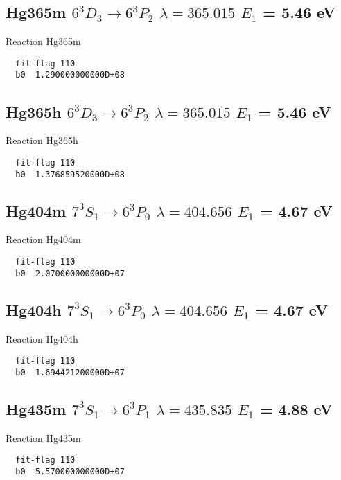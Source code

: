 \documentclass[12pt]{article}
\begin{document}
\subsection{
Hg365m   $6^3D_3 \rightarrow 6^3P_2 $ $\lambda= 365.015$ $E_1$ = 5.46 eV
}
Reaction Hg365m
\begin{small}\begin{verbatim}
  fit-flag 110
  b0  1.290000000000D+08
\end{verbatim}\end{small}

\subsection{
Hg365h   $6^3D_3 \rightarrow 6^3P_2 $ $\lambda= 365.015$ $E_1$ = 5.46 eV
}
Reaction Hg365h
\begin{small}\begin{verbatim}
  fit-flag 110
  b0  1.376859520000D+08
\end{verbatim}\end{small}

\subsection{
Hg404m   $7^3S_1 \rightarrow 6^3P_0 $ $\lambda= 404.656$ $E_1$ = 4.67 eV
}
Reaction Hg404m
\begin{small}\begin{verbatim}
  fit-flag 110
  b0  2.070000000000D+07
\end{verbatim}\end{small}

\subsection{
Hg404h   $7^3S_1 \rightarrow 6^3P_0 $ $\lambda= 404.656$ $E_1$ = 4.67 eV
}
Reaction Hg404h
\begin{small}\begin{verbatim}
  fit-flag 110
  b0  1.694421200000D+07
\end{verbatim}\end{small}

\subsection{
Hg435m   $7^3S_1 \rightarrow 6^3P_1 $ $\lambda= 435.835$ $E_1$ = 4.88 eV
}
Reaction Hg435m
\begin{small}\begin{verbatim}
  fit-flag 110
  b0  5.570000000000D+07
\end{verbatim}\end{small}
\end{document}
